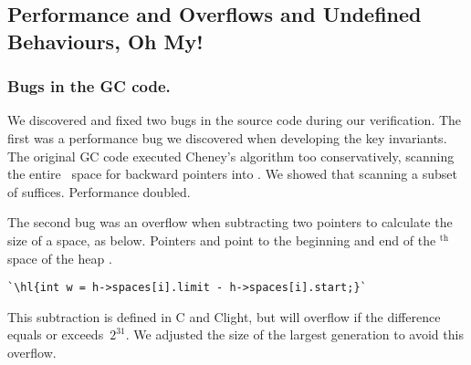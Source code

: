 
\subsection{Performance and Overflows and Undefined Behaviours, Oh My!} \label{sec:gcissues}

\subsubsection*{Bugs in the GC code.}
We discovered and fixed two bugs in the source code during our verification.
The first was a performance bug we discovered when developing the key invariants.
The original GC code executed Cheney's algorithm too conservatively,
scanning the entire~ space for backward pointers into . We
showed that scanning a subset of  suffices.  Performance doubled.

The second bug was an overflow when subtracting two pointers
to calculate the size of a space, as below. Pointers  and 
point to the beginning and end of the $^{\text{th}}$ space of the
heap .
\begin{lstlisting}[numbers=none]
  `\hl{int w = h->spaces[i].limit - h->spaces[i].start;}`
\end{lstlisting}
This subtraction is defined in C and Clight, but
will overflow if the difference equals
or exceeds~$2^{31}$. We adjusted the size of the largest generation to avoid this overflow.

